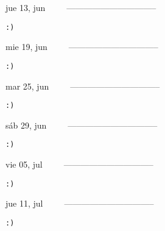 \documentclass[letterpaper,10pt]{article}
\begin{document}
\begin{multicols}{3}
{jue 13, jun\ \ \ \ \ --------------------------------}
\begin{flushright}\begin{small}\texttt{:)}\end{small}\end{flushright}
\vfill
{mie 19, jun\ \ \ \ \ --------------------------------}
\begin{flushright}\begin{small}\texttt{:)}\end{small}\end{flushright}\par
\vfill
{mar 25, jun\ \ \ \ \ --------------------------------}
\begin{flushright}\begin{small}\texttt{:)}\end{small}\end{flushright}\par
\vfill
\end{multicols}
\vspace{1.05cm}

\begin{multicols}{3}
{sáb 29, jun\ \ \ \ \ --------------------------------}
\begin{flushright}\begin{small}\texttt{:)}\end{small}\end{flushright}
\vfill
{vie 05, jul\ \ \ \ \ --------------------------------}
\begin{flushright}\begin{small}\texttt{:)}\end{small}\end{flushright}\par
\vfill
{jue 11, jul\ \ \ \ \ --------------------------------}
\begin{flushright}\begin{small}\texttt{:)}\end{small}\end{flushright}\par
\vfill
\end{multicols}
\vspace{1.05cm}
\end{document}
